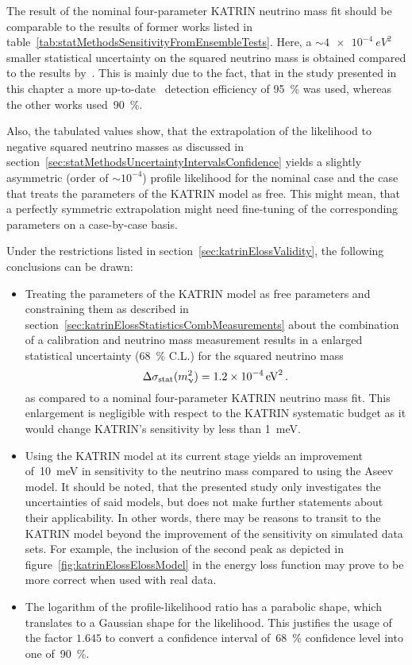 The result of the nominal four-parameter KATRIN neutrino mass fit should be comparable to the results of former works listed in table~\ref{tab:statMethodsSensitivityFromEnsembleTests}. Here, a $\sim\SI{4e-4}{eV^2}$ smaller statistical uncertainty on the squared neutrino mass is obtained compared to the results by~\cite{Kleesiek2014, Hoetzel2012}. This is mainly due to the fact, that in the study presented in this chapter a more up-to-date~\cite{Amsbaugh2015} detection efficiency of \SI{95}{\percent} was used, whereas the other works used~\SI{90}{\percent}. 

Also, the tabulated values show, that the extrapolation of the likelihood to negative squared neutrino masses as discussed in section~\ref{sec:statMethodsUncertaintyIntervalsConfidence} yields a slightly asymmetric (order of $\sim10^{-4}$) profile likelihood for the nominal case and the case that treats the parameters of the KATRIN model as free. This might mean, that a perfectly symmetric extrapolation might need fine-tuning of the corresponding parameters on a case-by-case basis.

Under the restrictions listed in section~\ref{sec:katrinElossValidity}, the following conclusions can be drawn:
\begin{itemize}
	\item Treating the parameters of the KATRIN model as free parameters and constraining them as described in section~\ref{sec:katrinElossStatisticsCombMeasurements} about the combination of a calibration and neutrino mass measurement results in a enlarged statistical uncertainty (\SI{68}{\percent} C.L.) for the squared neutrino mass
	\begin{equation}
		\label{eq:katrinElossModelResultsAsimovEnlargedStatUncert}
		\Delta\sigma_\mathrm{stat}(m_\upnu^2) = \SI{1.2e-4}{eV^2}
		\text{\,.} 
	\end{equation} 
	as compared to a nominal four-parameter KATRIN neutrino mass fit. This enlargement is negligible with respect to the KATRIN systematic budget as it would change KATRIN's sensitivity by less than \SI{1}{meV}.
	\item Using the KATRIN model at its current stage yields an improvement of~\SI{10}{meV} in sensitivity to the neutrino mass compared to using the Aseev model. It should be noted, that the presented study only investigates the uncertainties of said models, but does not make further statements about their applicability. In other words, there may be reasons to transit to the KATRIN model beyond the improvement of the sensitivity on simulated data sets. For example, the inclusion of the second peak as depicted in figure~\ref{fig:katrinElossElossModel} in the energy loss function may prove to be more correct when used with real data.
	\item The logarithm of the profile-likelihood ratio has a parabolic shape, which translates to a Gaussian shape for the likelihood. This justifies the usage of the factor $1.645$ to convert a confidence interval of~\SI{68}{\percent} confidence level into one of~\SI{90}{\percent}.
\end{itemize}

